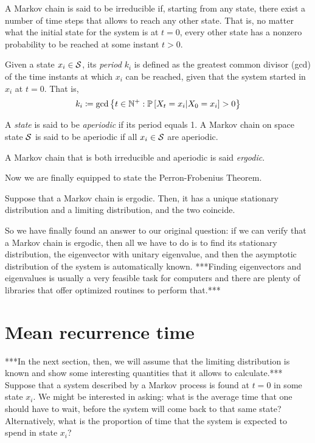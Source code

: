 \begin{ndef} 
    A Markov chain is said to be irreducible if, starting from any state, there exist a number of time steps that allows to reach any other state. That is, no matter what the initial state for the system is at $t=0$, every other state has a nonzero probability to be reached at some instant $t>0$.
\end{ndef}
\begin{ndef} 
    Given a state $x_i \in \mathcal{S}$, its \emph{period} $k_i$ is defined as the greatest common divisor (gcd) of the time instants at which $x_i$ can be reached, given that the system started in $x_i$ at $t=0$. That is,
    \begin{equation}
        k_i \coloneqq \text{gcd} \left\{ t\in \mathbb{N}^+ : \mathbb{P}\left[X_t = x_i | X_0 = x_i\right] > 0 \right\}
    \end{equation}
    
\end{ndef}
\begin{ndef} [Aperiodicity]
    A \emph{state} is said to be \emph{aperiodic} if its period equals 1. A Markov chain on space state $\mathcal{S}$ is said to be aperiodic if all $x_i \in \mathcal{S}$ are aperiodic. 
\end{ndef}
\begin{ndef} [Ergodicity]
    A Markov chain that is both irreducible and aperiodic is said \emph{ergodic}.
\end{ndef}
Now we are finally equipped to state the Perron-Frobenius Theorem.

\begin{theorem} \label{th:perron-frobenius}
    Suppose that a Markov chain is ergodic. Then, it has a unique stationary distribution and a limiting distribution, and the two coincide.
\end{theorem}

\medskip
So we have finally found an answer to our original question: if we can verify that a Markov chain is ergodic, then all we have to do is to find its stationary distribution, \ie the eigenvector with unitary eigenvalue, and then the asymptotic distribution of the system is automatically known. ***Finding eigenvectors and eigenvalues is usually a very feasible task for computers and there are plenty of libraries that offer optimized routines to perform that.***


\section{Mean recurrence time}
***In the next section, then, we will assume that the limiting distribution is known and show some interesting quantities that it allows to calculate.***
Suppose that a system described by a Markov process is found at $t = 0$ in some state $x_i$. We might be interested in asking: what is the average time that one should have to wait, before the system will come back to that same state? Alternatively, what is the proportion of time that the system is expected to spend in state $x_i$?

